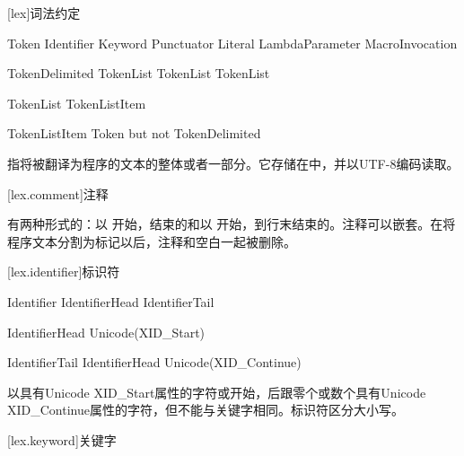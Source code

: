 
[lex]{词法约定}

\begin{bnf}{Token}
    Identifier \br
    Keyword \br
    Punctuator \br
    Literal \br
    LambdaParameter \br
    MacroInvocation
\end{bnf}

\begin{bnf}{TokenDelimited}
    \terminal{(} TokenList\bnfq \terminal{)} \br
    \terminal{[} TokenList\bnfq \terminal{]} \br
    \terminal{\{} TokenList\bnfq \terminal{\}} \br
\end{bnf}

\begin{bnf}{TokenList}
    TokenListItem\bnfp
\end{bnf}

\begin{bnf}{TokenListItem}
    Token \textnormal{but not} \terminal{( ) [ ] \{ \}} \br
    TokenDelimited
\end{bnf}

\pnum
{}指将被翻译为\X{}程序的文本的整体或者一部分。它存储在中，并以UTF-8编码读取。

[lex.comment]{注释}

\pnum
有两种形式的：以\tcode{/*} 开始，\tcode{*/}结束的和以\tcode{//} 开始，到行末结束的。注释可以嵌套。在将程序文本分割为标记以后，注释和空白一起被删除。

[lex.identifier]{标识符}

\begin{bnf}{Identifier}
    IdentifierHead IdentifierTail\bnfs
\end{bnf}

\begin{bnf}{IdentifierHead}
    Unicode(XID_Start) \br
    \terminal{_}
\end{bnf}

\begin{bnf}{IdentifierTail}
    IdentifierHead \br
    Unicode(XID_Continue)
\end{bnf}

\pnum
{}以具有Unicode XID_Start属性的字符或\tcode{_}开始，后跟零个或数个具有Unicode XID_Continue属性的字符，但不能与关键字相同。标识符区分大小写。

[lex.keyword]{关键字}

